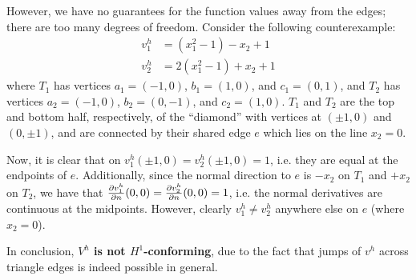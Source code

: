 \begin{problem}{1}
\begin{solution}
However, we have no guarantees for the function values away from the edges; there are too many degrees of freedom.
Consider the following counterexample:
\begin{align*}
v^h_1 &= (x_1^2 - 1) - x_2 + 1 \\
v^h_2 &= 2(x_1^2 - 1) + x_2 + 1
\end{align*}
where $T_1$ has vertices $a_1=(-1,0)$, $b_1=(1,0)$, and $c_1=(0,1)$, and $T_2$ has vertices $a_2=(-1,0)$, $b_2=(0,-1)$, and $c_2=(1,0)$.
$T_1$ and $T_2$ are the top and bottom half, respectively, of the ``diamond'' with vertices at $(\pm 1,0)$ and $(0,\pm 1)$, and are connected by their shared edge $e$ which lies on the line $x_2 = 0$.

Now, it is clear that on $v^h_1(\pm 1,0) = v^h_2(\pm 1,0) = 1$, i.e. they are equal at the endpoints of $e$.
Additionally, since the normal direction to $e$ is $-x_2$ on $T_1$ and $+x_2$ on $T_2$, we have that $\frac{\partial v^h_1}{\partial n}(0,0) = \frac{\partial v^h_2}{\partial n}(0,0) = 1$, i.e. the normal derivatives are continuous at the midpoints.
However, clearly $v^h_1 \neq v^h_2$ anywhere else on $e$ (where $x_2=0$).

In conclusion, \textbf{$V^h$ is not $H^1$-conforming}, due to the fact that jumps of $v^h$ across triangle edges is indeed possible in general.



\end{solution}
\pagebreak

\end{problem} %
\pagebreak


